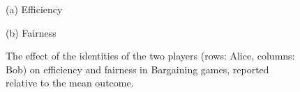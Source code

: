 \begin{figure}[ht]

\vspace{1ex}
\begin{minipage}[t]{0.48\textwidth}
    \centering
    \hspace{12em} (a) Efficiency \par\vspace{1ex}
    
\end{minipage}
\hfill
\begin{minipage}[t]{0.48\textwidth}
    \centering
    (b) Fairness \par\vspace{1ex}
    
\end{minipage}
\caption{The effect of the identities of the two players (rows: Alice, columns: Bob) on efficiency and fairness in Bargaining games, reported relative to the mean outcome.}
\label{table:models_bargaining}

\end{figure}
